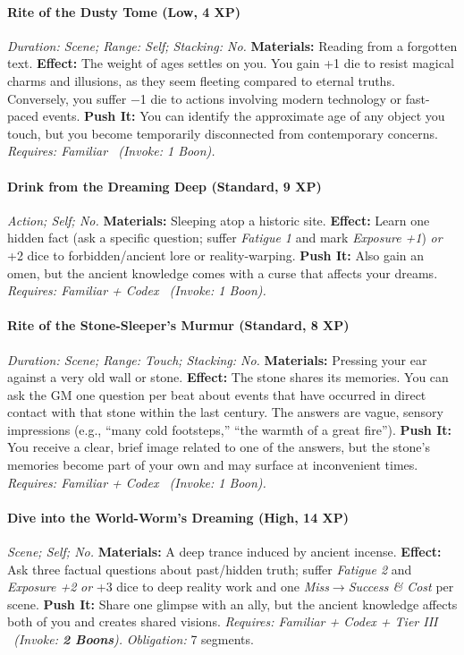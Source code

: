 \paragraph{Rite of the Dusty Tome (Low, 4 XP)} \emph{Duration: Scene; Range: Self; Stacking: No.}
\textbf{Materials:} Reading from a forgotten text.
\textbf{Effect:} The weight of ages settles on you. You gain +1 die to resist magical charms and illusions, as they seem fleeting compared to eternal truths. Conversely, you suffer −1 die to actions involving modern technology or fast-paced events.
\textbf{Push It:} You can identify the approximate age of any object you touch, but you become temporarily disconnected from contemporary concerns.
\emph{Requires: Familiar \ (\textit{Invoke:} 1 Boon).}
\paragraph{Drink from the Dreaming Deep (Standard, 9 XP)} \emph{Action; Self; No.}
\textbf{Materials:} Sleeping atop a historic site.
\textbf{Effect:} Learn one hidden fact (ask a specific question; suffer \emph{Fatigue 1} and mark \emph{Exposure +1}) \emph{or} +2 dice to forbidden/ancient lore or reality-warping.
\textbf{Push It:} Also gain an omen, but the ancient knowledge comes with a curse that affects your dreams.
\emph{Requires: Familiar + Codex \ (\textit{Invoke:} 1 Boon).}
\paragraph{Rite of the Stone-Sleeper's Murmur (Standard, 8 XP)} \emph{Duration: Scene; Range: Touch; Stacking: No.}
\textbf{Materials:} Pressing your ear against a very old wall or stone.
\textbf{Effect:} The stone shares its memories. You can ask the GM one question per beat about events that have occurred in direct contact with that stone within the last century. The answers are vague, sensory impressions (e.g., ``many cold footsteps,'' ``the warmth of a great fire'').
\textbf{Push It:} You receive a clear, brief image related to one of the answers, but the stone's memories become part of your own and may surface at inconvenient times.
\emph{Requires: Familiar + Codex \ (\textit{Invoke:} 1 Boon).}
\paragraph{Dive into the World-Worm's Dreaming (High, 14 XP)} \emph{Scene; Self; No.}
\textbf{Materials:} A deep trance induced by ancient incense.
\textbf{Effect:} Ask three factual questions about past/hidden truth; suffer \emph{Fatigue 2} and \emph{Exposure +2} \emph{or} +3 dice to deep reality work and one \emph{Miss$\rightarrow$Success \& Cost} per scene.
\textbf{Push It:} Share one glimpse with an ally, but the ancient knowledge affects both of you and creates shared visions.
\emph{Requires: Familiar + Codex + Tier III \ (\textit{Invoke:} \textbf{2 Boons}).}
\emph{Obligation:} 7 segments.

